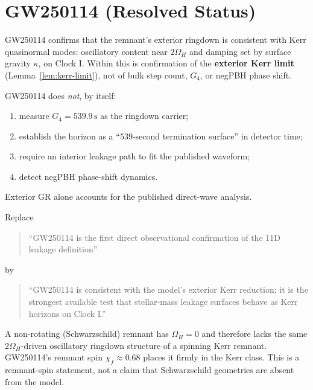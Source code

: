 \section{GW250114 (Resolved Status)}
\label{sec:gw250114}

\begin{theorem}
\label{thm:gw-confirms}
GW250114 confirms that the remnant’s exterior ringdown is consistent with Kerr
quasinormal modes: oscillatory content near \(2\Omega_H\) and damping set by
surface gravity \(\kappa\), on Clock I. Within \model this is confirmation of
the \textbf{exterior Kerr limit} (Lemma~\ref{lem:kerr-limit}), not of bulk step
count, \(G_4\), or negPBH phase shift.
\end{theorem}

\begin{theorem}
\label{thm:gw-not}
GW250114 does \emph{not}, by itself:
\begin{enumerate}[label=(\roman*)]
  \item measure \(G_4=539.9\,\mathrm{s}\) as the ringdown carrier;
  \item establish the horizon as a ``\(539\)-second termination surface'' in
        detector time;
  \item require an interior leakage path to fit the published waveform;
  \item detect negPBH phase-shift dynamics.
\end{enumerate}
Exterior GR alone accounts for the published direct-wave analysis.
\end{theorem}

\begin{corollary}
\label{cor:slogan}
Replace
\begin{quote}
``GW250114 is the first direct observational confirmation of the 11D leakage
definition''
\end{quote}
by
\begin{quote}
``GW250114 is consistent with the model’s exterior Kerr reduction; it is the
strongest available test that stellar-mass leakage surfaces behave as Kerr
horizons on Clock I.''
\end{quote}
\end{corollary}

\begin{lemma}
\label{lem:schwarzschild}
A non-rotating (Schwarzschild) remnant has \(\Omega_H=0\) and therefore lacks
the same \(2\Omega_H\)-driven oscillatory ringdown structure of a spinning Kerr
remnant. GW250114’s remnant spin \(\chi_f\approx 0.68\) places it firmly in the
Kerr class. This is a remnant-spin statement, not a claim that Schwarzschild
geometries are absent from the model.
\end{lemma}

